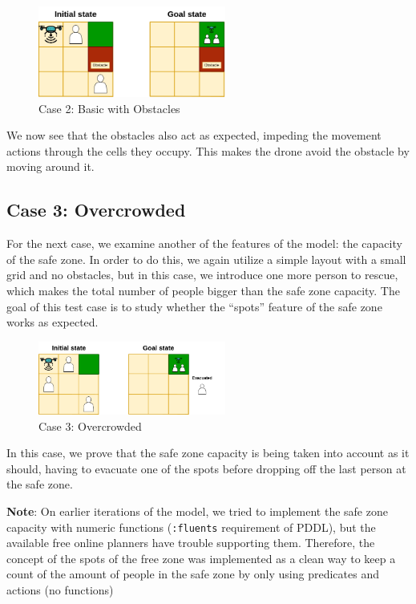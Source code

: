 \documentclass{article}
\begin{document}
\begin{figure}[H]
    \centering
    \includegraphics[width=0.55\textwidth]{assets/problem-2-basic-obstacle.drawio.png}
    \caption{Case 2: Basic with Obstacles}
    \label{fig:initial-state-obstacles}
\end{figure}
\FloatBarrier

We now see that the obstacles also act as expected, impeding the movement actions through the cells they occupy. This makes the drone avoid the obstacle by moving around it.

\subsection{Case 3: Overcrowded}

For the next case, we examine another of the features of the model: the capacity of the safe zone. In order to do this, we again utilize a simple layout with a small grid and no obstacles, but in this case, we introduce one more person to rescue, which makes the total number of people bigger than the safe zone capacity. The goal of this test case is to study whether the “spots” feature of the safe zone works as expected.

\begin{figure}[H]
    \centering
    \includegraphics[width=0.55\textwidth]{assets/problem-3-overcrowded.drawio.png}
    \caption{Case 3: Overcrowded}
    \label{fig:initial-state-overcrowded}
\end{figure}
\FloatBarrier

In this case, we prove that the safe zone capacity is being taken into account as it should, having to evacuate one of the spots before dropping off the last person at the safe zone.

\textbf{Note}: On earlier iterations of the model, we tried to implement the safe zone capacity with numeric functions (\texttt{:fluents} requirement of PDDL), but the available free online planners have trouble supporting them. Therefore, the concept of the spots of the free zone was implemented as a clean way to keep a count of the amount of people in the safe zone by only using predicates and actions (no functions)
\end{document}
